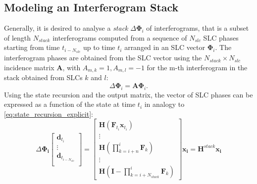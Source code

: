 \documentclass{article}
\begin{document}
\subsection{Modeling an Interferogram Stack}
Generally, it is desired to analyse a \emph{stack} $\Delta\mathbf{\Phi}_{i}$  of interferograms, that is a subset of length $N_{stack}$ interferograms computed from a sequence of $N_{slc}$ SLC phases starting from time $t_{i-N_{slc}}$ up to time $t_{i}$ arranged in an SLC vector $\mathbf{\Phi}_i$. The interferogram phases  are obtained from the SLC vector using the  $N_{stack}\times N_{slc}$ incidence matrix $\mathbf{A}$, with $A_{m,k} = 1, A_{m,l}=-1$ for the m-th interferogram in the stack obtained from SLCs $k$ and $l$\cite{Agram2015}:
\begin{equation}
	 \Delta\mathbf{\Phi}_{i} = \mathbf{A} \mathbf{\Phi}_{i}.
\end{equation}
Using the state recursion and the output matrix, the vector of SLC phases can be expressed as a function of the state at time $t_i$ in analogy to \autoref{eq:state_recursion_explicit}:
\begin{equation}
	\Delta\mathbf{\Phi_{i}} 
		\begin{bmatrix}
			\mathbf{d}_{t_{i}}\\
			\vdots\\
			\mathbf{d}_{t_{i-N_{slc}}}\\
		\end{bmatrix}
		=\begin{bmatrix}
		 	\mathbf{H} \left(\mathbf{F}_{t_i} \mathbf{x}_{t_{i}}\right)\\
		 	\vdots\\
		 	\mathbf{H} \left(\prod_{k=i+n}^{i}\mathbf{F}_k\right)\\
		 	\vdots\\
		 	\mathbf{H} \left(\mathbf{I} -\prod_{k=i+N_{stack}}^{i}\mathbf{F}_k\right)
		\end{bmatrix}\mathbf{x_i} = \mathbf{H}^{stack} \mathbf{x_i}
\end{equation}
\end{document}
